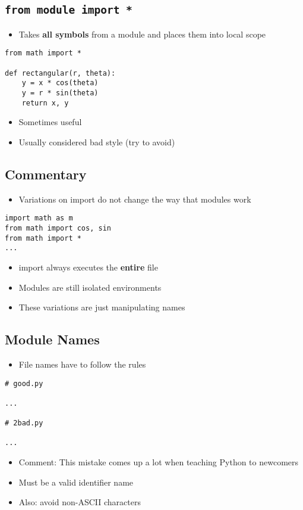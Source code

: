 \documentclass[11pt]{article}
\begin{document}
\subsection*{\texttt{from module import *}}
\label{sec:orgheadline5}
\begin{itemize}
\item Takes \textbf{all symbols} from a module and places
them into local scope
\end{itemize}
\begin{verbatim}
from math import *

def rectangular(r, theta):
    y = x * cos(theta)
    y = r * sin(theta)
    return x, y
\end{verbatim}
\begin{itemize}
\item Sometimes useful
\item Usually considered bad style (try to avoid)
\end{itemize}

\subsection*{Commentary}
\label{sec:orgheadline6}
\begin{itemize}
\item Variations on import do not change the way that
modules work
\end{itemize}
\begin{verbatim}
import math as m
from math import cos, sin
from math import *
...
\end{verbatim}
\begin{itemize}
\item import always executes the \textbf{entire} file
\item Modules are still isolated environments
\item These variations are just manipulating names
\end{itemize}

\subsection*{Module Names}
\label{sec:orgheadline7}
\begin{itemize}
\item File names have to follow the rules
\end{itemize}
\begin{verbatim}
# good.py

...

# 2bad.py

...
\end{verbatim}
\begin{itemize}
\item Comment: This mistake comes up a lot when
teaching Python to newcomers
\item Must be a valid identifier name
\item Also: avoid non-ASCII characters
\end{itemize}
\end{document}
